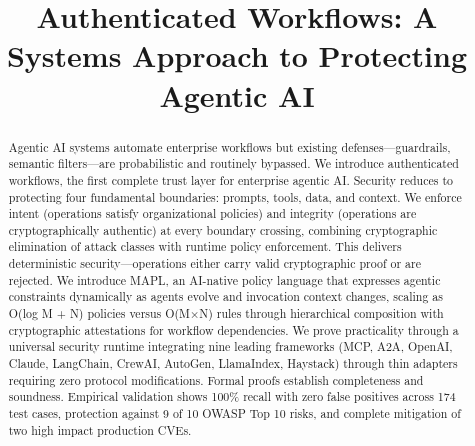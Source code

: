 \documentclass[conference,compsoc]{IEEEtran}
\begin{document}
\title{Authenticated Workflows: A Systems Approach to Protecting Agentic AI}

\author{
\and
{}
}

\maketitle

\begin{abstract}
Agentic AI systems automate enterprise workflows but existing defenses—guardrails, semantic filters—are probabilistic and routinely bypassed. We introduce authenticated workflows, the first complete trust layer for enterprise agentic AI. Security reduces to protecting four fundamental boundaries: prompts, tools, data, and context. We enforce intent (operations satisfy organizational policies) and integrity (operations are cryptographically authentic) at every boundary crossing, combining cryptographic elimination of attack classes with runtime policy enforcement. This delivers deterministic security—operations either carry valid cryptographic proof or are rejected. We introduce MAPL, an AI-native policy language that expresses agentic constraints dynamically as agents evolve and invocation context changes, scaling as O(log M + N) policies versus O(M×N) rules through hierarchical composition with cryptographic attestations for workflow dependencies. We prove practicality through a universal security runtime integrating nine leading frameworks (MCP, A2A, OpenAI, Claude, LangChain, CrewAI, AutoGen, LlamaIndex, Haystack) through thin adapters requiring zero protocol modifications. Formal proofs establish completeness and soundness. Empirical validation shows 100\% recall with zero false positives across 174 test cases, protection against 9 of 10 OWASP Top 10 risks, and complete mitigation of two high impact production CVEs.
\end{abstract}






\end{document}

